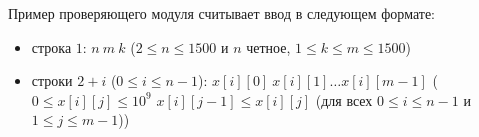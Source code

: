 Пример проверяющего модуля считывает ввод в следующем формате:
\begin{itemize}
\item строка $1$: $n\ m\ k$ ($2 \leq n \leq 1500$ и $n$ четное, $1 \leq k \leq m \leq 1500$)
\item строки $2+i$ ($0\leq i\leq n-1$): $x[i][0]\ x[i][1]\ldots x[i][m-1]$ ($0 \leq x[i][j] \leq 10^9$ $x[i][j-1] \leq x[i][j]$ (для всех $0 \leq i \leq n-1$ и $1 \leq j \leq m-1$))
\end{itemize}
